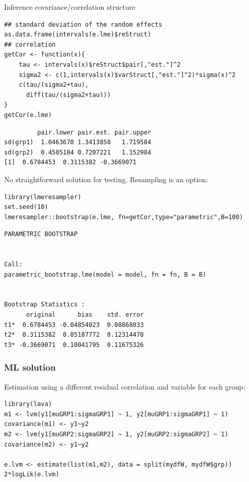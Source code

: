 \documentclass{article}
\begin{document}
Inference covariance/correlation structure
\lstset{language=r,label= ,caption= ,captionpos=b,numbers=none}
\begin{lstlisting}
## standard deviation of the random effects
as.data.frame(intervals(e.lme)$reStruct)
## correlation
getCor <- function(x){
    tau <- intervals(x)$reStruct$pair[,"est."]^2
    sigma2 <- c(1,intervals(x)$varStruct[,"est."]^2)*sigma(x)^2
    c(tau/(sigma2+tau),
      diff(tau/(sigma2+tau)))
}
getCor(e.lme)
\end{lstlisting}

\begin{verbatim}
         pair.lower pair.est. pair.upper
sd(grp1)  1.0463670 1.3413858   1.719584
sd(grp2)  0.4505184 0.7207221   1.152984
[1]  0.6784453  0.3115382 -0.3669071
\end{verbatim}

No straightforward solution for testing. Resampling is an option:
\lstset{language=r,label= ,caption= ,captionpos=b,numbers=none}
\begin{lstlisting}
library(lmeresampler)
set.seed(10)
lmeresampler::bootstrap(e.lme, fn=getCor,type="parametric",B=100)
\end{lstlisting}

\begin{verbatim}
PARAMETRIC BOOTSTRAP


Call:
parametric_bootstrap.lme(model = model, fn = fn, B = B)


Bootstrap Statistics :
      original      bias    std. error
t1*  0.6784453 -0.04854023  0.08868033
t2*  0.3115382  0.05187772  0.12314478
t3* -0.3669071  0.10041795  0.11675326
\end{verbatim}

\clearpage

\subsubsection{ML solution}
\label{sec:orgff2a57d}
Estimation using a different residual correlation and variable for each group:
\lstset{language=r,label= ,caption= ,captionpos=b,numbers=none}
\begin{lstlisting}
library(lava)
m1 <- lvm(y1[muGRP1:sigmaGRP1] ~ 1, y2[muGRP1:sigmaGRP1] ~ 1)
covariance(m1) <- y1~y2
m2 <- lvm(y1[muGRP2:sigmaGRP2] ~ 1, y2[muGRP2:sigmaGRP2] ~ 1)
covariance(m2) <- y1~y2

e.lvm <- estimate(list(m1,m2), data = split(mydfW, mydfW$grp))
2*logLik(e.lvm)
\end{lstlisting}
\end{document}
